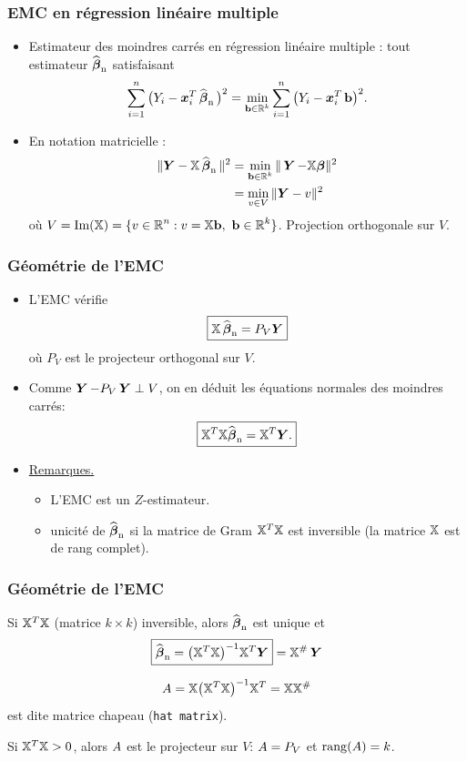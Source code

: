 \begin{frame}
\frametitle{EMC en régression linéaire multiple}
\begin{itemize}
\item Estimateur des \alert{moindres carrés} en régression
linéaire multiple : tout estimateur $\operatorname{\widehat{\boldsymbol{\beta}}_n}$ satisfaisant
$$\sum_{i = 1}^n
\big(Y_i- \operatorname{\boldsymbol{x}}_i^T \operatorname{\widehat{\boldsymbol{\beta}}_n} \big)^2 = \min_{\mathbf{b} \in \operatorname{{\mathbb R}}^k}\sum_{i =
1}^n \big(Y_i- \operatorname{\boldsymbol{x}}_i^T \mathbf{b}\big)^2.$$
\item En notation matricielle :
\begin{align*}
\|\boldsymbol{Y}-\mathbb{X}\operatorname{\widehat{\boldsymbol{\beta}}_n}\|^2 &=   \min_{\mathbf{b} \in \operatorname{{\mathbb R}}^k}\|\operatorname{\boldsymbol{Y}} -\mathbb{X}\boldsymbol{\beta}\|^2\\
&= \min_{v \in V}\|\boldsymbol{Y}-v\|^2
\end{align*}
o\`u $V=\text{Im}(\mathbb{X}) = \{v\in \operatorname{{\mathbb R}}^n: v=\mathbb{X} \mathbf{b}, \
\mathbf{b} \in \operatorname{{\mathbb R}}^k\}$. \alert{Projection orthogonale sur $V$}.
\end{itemize}
\end{frame}


 \begin{frame}
\frametitle{Géométrie de l'EMC}
 \begin{itemize}
 \item L'EMC vérifie
$$\boxed{\mathbb{X} \operatorname{\widehat{\boldsymbol{\beta}}_n} = P_V \boldsymbol{Y}}$$
o\`u $P_V$ est le projecteur orthogonal sur $V$.
\item Comme $ \operatorname{\boldsymbol{Y}} - P_V \operatorname{\boldsymbol{Y}} \perp V$, on en déduit \alert{les équations normales des
moindres carrés}:
$$\boxed{\mathbb{X}^T\mathbb{X} {\operatorname{\widehat{\boldsymbol{\beta}}_n}} =
\mathbb{X}^T\boldsymbol{Y}.}$$
\item \underline{Remarques.}
  \begin{itemize}
  \item L'EMC est un $Z$-estimateur.
  \item \alert{unicité} de $\operatorname{\widehat{\boldsymbol{\beta}}_n}$ si la matrice de Gram
  $\mathbb{X}^T\mathbb{X}$ est inversible (la matrice $\mathbb{X}$ est de rang complet).
  \end{itemize}
\end{itemize}
\end{frame}

\begin{frame} \frametitle{Géométrie de l'EMC}
\begin{prop}
Si $\mathbb{X}^T\mathbb{X}$ (matrice $k \times k$) inversible, alors
$\operatorname{\widehat{\boldsymbol{\beta}}_n}$ \alert{est unique} et
$$\boxed{\operatorname{\widehat{\boldsymbol{\beta}}_n} = \big(\mathbb{X}^T\mathbb{X}\big)^{-1}\mathbb{X}^T \boldsymbol{Y}}= \mathbb{X}^{\#} \operatorname{\boldsymbol{Y}}$$
\end{prop}
$$
A = \mathbb{X}\big(\mathbb{X}^T\mathbb{X}\big)^{-1}\mathbb{X}^T = \mathbb{X} \mathbb{X}^{\#}
$$
est dite \alert{matrice chapeau} (\texttt{hat matrix}).
%
\begin{prop}
Si $\mathbb{X}^T\mathbb{X}>0$, alors $A$ est le projecteur sur
$V$: \alert{$A=P_V$} et \alert{${\rm rang}(A)=k$}.
\end{prop}
\end{frame}


